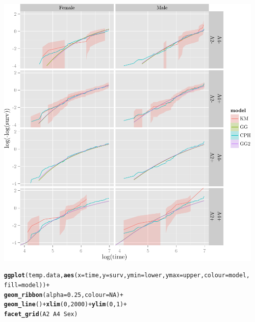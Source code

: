 \documentclass{article}\usepackage[]{graphicx}\usepackage[]{color}
\makeatletter
\def\maxwidth{ %
  \ifdim\Gin@nat@width>\linewidth
    \linewidth
  \else
    \Gin@nat@width
  \fi
}
\newcommand{\hlnum}[1]{\textcolor[rgb]{0.686,0.059,0.569}{#1}}%
\newcommand{\hlopt}[1]{\textcolor[rgb]{0,0,0}{#1}}%
\newcommand{\hlstd}[1]{\textcolor[rgb]{0.345,0.345,0.345}{#1}}%
\newcommand{\hlkwc}[1]{\textcolor[rgb]{0.333,0.667,0.333}{#1}}%
\newcommand{\hlkwd}[1]{\textcolor[rgb]{0.737,0.353,0.396}{\textbf{#1}}}%
\newenvironment{kframe}{%
 \def\at@end@of@kframe{}%
 \ifinner\ifhmode%
  \def\at@end@of@kframe{\end{minipage}}%
  \begin{minipage}{\columnwidth}%
 \fi\fi%
 \def\FrameCommand##1{\hskip\@totalleftmargin \hskip-\fboxsep
 \colorbox{shadecolor}{##1}\hskip-\fboxsep
     \hskip-\linewidth \hskip-\@totalleftmargin \hskip\columnwidth}%
 \MakeFramed {\advance\hsize-\width
   \@totalleftmargin\z@ \linewidth\hsize
   \@setminipage}}%
 {\par\unskip\endMakeFramed%
 \at@end@of@kframe}
\newenvironment{knitrout}{}{} %
\makeatother
\begin{document}
\begin{knitrout}
{\centering \includegraphics[width=\maxwidth]{figure/05-final-fit-assessment-3-1} 

}


\begin{kframe}\begin{alltt}
\hlkwd{ggplot}\hlstd{(temp.data,} \hlkwd{aes}\hlstd{(}\hlkwc{x} \hlstd{= time,} \hlkwc{y} \hlstd{= surv,} \hlkwc{ymin} \hlstd{= lower,} \hlkwc{ymax} \hlstd{= upper,} \hlkwc{colour} \hlstd{= model,} \hlkwc{fill} \hlstd{= model))} \hlopt{+}
        \hlkwd{geom_ribbon}\hlstd{(}\hlkwc{alpha} \hlstd{=} \hlnum{0.25}\hlstd{,} \hlkwc{colour} \hlstd{=} \hlnum{NA}\hlstd{)} \hlopt{+}
        \hlkwd{geom_line}\hlstd{()} \hlopt{+} \hlkwd{xlim}\hlstd{(}\hlnum{0}\hlstd{,} \hlnum{2000}\hlstd{)} \hlopt{+} \hlkwd{ylim}\hlstd{(}\hlnum{0}\hlstd{,} \hlnum{1}\hlstd{)} \hlopt{+}
        \hlkwd{facet_grid}\hlstd{(A2} \hlopt{~} \hlstd{A4} \hlopt{~} \hlstd{Sex)}
\end{alltt}


{\ttfamily\noindent\color{warningcolor}{\#\# Warning: Removed 9 rows containing missing values (geom\_path).}}

{\ttfamily\noindent\color{warningcolor}{\#\# Warning: Removed 3 rows containing missing values (geom\_path).}}

{\ttfamily\noindent\color{warningcolor}{\#\# Warning: Removed 12 rows containing missing values (geom\_path).}}


\end{kframe}
\end{knitrout}
\end{document}
